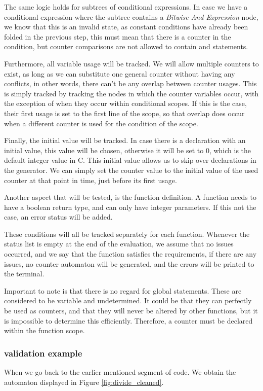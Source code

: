 \documentclass[12pt]{article}
\begin{document}
The same logic holds for subtrees of conditional expressions. In case we have a conditional expression where the subtree contains a \textit{Bitwise And Expression} node, we know that this is an invalid state, as constant conditions have already been folded in the previous step, this must mean that there is a counter in the condition, but counter comparisons are not allowed to contain and statements.

Furthermore, all variable usage will be tracked. We will allow multiple counters to exist, as long as we can substitute one general counter without having any conflicts, in other words, there can't be any overlap between counter usages. This is simply tracked by tracking the nodes in which the counter variables occur, with the exception of when they occur within conditional scopes. If this is the case, their first usage is set to the first line of the scope, so that overlap does occur when a different counter is used for the condition of the scope. 

Finally, the initial value will be tracked. In case there is a declaration with an initial value, this value will be chosen, otherwise it will be set to 0, which is the default integer value in C. This initial value allows us to skip over declarations in the generator. We can simply set the counter value to the initial value of the used counter at that point in time, just before its first usage.

Another aspect that will be tested, is the function definition. A function needs to have a boolean return type, and can only have integer parameters. If this not the case, an error status will be added.

These conditions will all be tracked separately for each function. Whenever the status list is empty at the end of the evaluation, we assume that no issues occurred, and we say that the function satisfies the requirements, if there are any issues, no counter automaton will be generated, and the errors will be printed to the terminal.

Important to note is that there is no regard for global statements. These are considered to be variable and undetermined. It could be that they can perfectly be used as counters, and that they will never be altered by other functions, but it is impossible to determine this efficiently. Therefore, a counter must be declared within the function scope.

\subsubsection{validation example}
When we go back to the earlier mentioned segment of code. We obtain the automaton displayed in Figure \ref{fig:divide_cleaned}.
\end{document}
